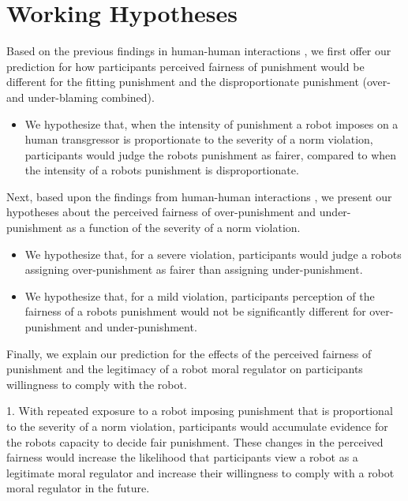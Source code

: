 \documentclass{article} %
\begin{document}
\section{Working Hypotheses}
Based on the previous findings in human-human interactions \cite{miller1981social,hogan1981retributive,ball1994just}, we first offer our prediction for how participants perceived fairness of punishment would be different for the fitting punishment and the disproportionate punishment (over- and under-blaming combined).
\begin{itemize}
\item We hypothesize that, when the intensity of punishment a robot imposes on a human transgressor is proportionate to the severity of a norm violation, participants would judge the robots punishment as fairer, compared to when the intensity of a robots punishment is disproportionate.
\end{itemize}

Next, based upon the findings from human-human interactions \cite{wagstaff1997overpunishment}, we present our hypotheses about the perceived fairness of over-punishment and under-punishment as a function of the severity of a norm violation.
\begin{itemize}
\item We hypothesize that, for a severe violation, participants would judge a robots assigning over-punishment as fairer than assigning under-punishment.
\item We hypothesize that, for a mild violation, participants perception of the fairness of a robots punishment would not be significantly different for over-punishment and under-punishment.
\end{itemize}

Finally, we explain our prediction for the effects of the perceived fairness of punishment and the legitimacy of a robot moral regulator on participants willingness to comply with the robot.
\begin{itemize}
1. With repeated exposure to a robot imposing punishment that is proportional to the severity of a norm violation, participants would accumulate evidence for the robots capacity to decide fair punishment. These changes in the perceived fairness would increase the likelihood that participants view a robot as a legitimate moral regulator and increase their willingness to comply with a robot moral regulator in the future.
\end{itemize}

\vspace{-1.57mm}
\vspace{-2.20mm}
\end{document}
